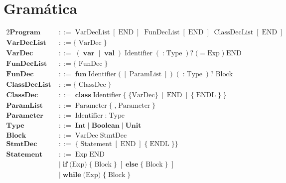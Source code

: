 \documentclass[a4paper,10pt]{article}
\begin{document}
\section*{Gramática}

\begin{alignat*}{2}
\textbf{Program}
  \;&::=  \; \text{VarDecList} \;[\;\text{END}\;]\;
    \; \text{FunDecList} \;[\;\text{END}\;]\;
    \;\text{ClassDecList} \;[\;\text{END}\;]\; \\[3pt]
\textbf{VarDecList}
\;&::= \{ \; \text{VarDec}\; \} \\[3pt]
\textbf{VarDec}
  \;&::=\; (\;\textbf{var}\;\mid\;\textbf{val}\;)\;\text{Identifier}
     \;(\;\textbf{:}\;\text{Type}\;)?
     \; \text{(} \; \textbf{=}\;\text{Exp} \; \text{)} \;\text{END} \\[3pt]
\textbf{FunDecList}
\;&::= \{ \; \text{FunDec}\; \} \\[3pt]
\textbf{FunDec}
  \;&::=\; \textbf{fun}\;\text{Identifier}
     \;\textbf{(}\;[\;\text{ParamList}\;]\;\textbf{)}
     \;(\;\textbf{:}\;\text{Type}\;)?
     \;\text{Block} \\[3pt]
\textbf{ClassDecList}
\;&::= \{ \; \text{ClassDec}\; \} \\[3pt]
\textbf{ClassDec}
  \;&::=\; \textbf{class}\;\text{Identifier}
     \;\textbf{\{}\;\text{\{VarDec\}}\;[\;\text{END}\;]\;\{\;\text{ENDL}\;\}\;\textbf{\}} \\[3pt]
\textbf{ParamList}
  \;&::=\; \text{Parameter} \; \{ \; \textbf{,} \; \text{Parameter} \;\} \\[3pt]
\textbf{Parameter}
  \;&::=\; \text{Identifier}\;\textbf{:}\;\text{Type} \\[3pt]
\textbf{Type}
  \;&::=\; \textbf{Int}
   \;|\;\textbf{Boolean}
   \;|\;\textbf{Unit} \\[3pt]
\textbf{Block}
  \;&::=\; \text{VarDec}  \; \text{StmtDec} \; \\[3pt]
\textbf{StmtDec}
  \;&::=\; \{\;\text{Statement}\;[\;\text{END}\;]\;\{\;\text{ENDL}\;\}\} \\[3pt]
\textbf{Statement}
\;&::=\;  \text{Exp}\;\text{END} \\
  \;&\mid\; \textbf{if}\;\textbf{(} \text{Exp} \textbf{)}\; \{ \; \text{Block} \; \}
     \;[\;\textbf{else} \; \{  \;\text{Block} \; \} \;] \\[3pt]
  \;&\mid\; \textbf{while}\;\textbf{(} \text{Exp} \textbf{)}\; \{ \; \text{Block}\; \} \\[3pt]

\end{alignat*}
\end{document}
